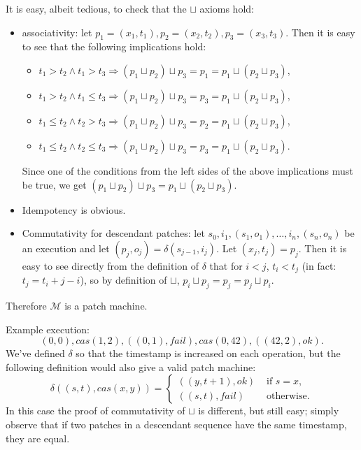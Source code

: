 \documentclass[12pt,a4paper,en]{pracamgr}
\newcommand{\mc}[1]{\mathcal{#1}}
\begin{document}
\begin{ex}
	It is easy, albeit tedious, to check that the $\sqcup$ axioms hold:
	\begin{itemize}
		\item associativity: let $p_1 = (x_1, t_1), p_2 = (x_2, t_2), p_3 = (x_3, t_3)$. Then it is easy to see that the following implications hold:
			\begin{itemize}
				\item $t_1 > t_2 \land t_1 > t_3 \Rightarrow (p_1 \sqcup p_2) \sqcup p_3 = p_1 = p_1 \sqcup (p_2 \sqcup p_3)$,
				\item $t_1 > t_2 \land t_1 \le t_3 \Rightarrow (p_1 \sqcup p_2) \sqcup p_3 = p_3 = p_1 \sqcup (p_2 \sqcup p_3)$,
				\item $t_1 \le t_2 \land t_2 > t_3 \Rightarrow (p_1 \sqcup p_2) \sqcup p_3 = p_2 = p_1 \sqcup (p_2 \sqcup p_3)$,
				\item $t_1 \le t_2 \land t_2 \le t_3 \Rightarrow (p_1 \sqcup p_2) \sqcup p_3 = p_3 = p_1 \sqcup (p_2 \sqcup p_3)$.
			\end{itemize}
            Since one of the conditions from the left sides of the above implications must be true, we get $(p_1 \sqcup p_2) \sqcup p_3 = p_1 \sqcup (p_2 \sqcup p_3)$.
		\item Idempotency is obvious.
		\item Commutativity for descendant patches: let $s_0, i_1, (s_1, o_1), \dots, i_n, (s_n, o_n)$ be an execution and let $(p_j, o_j) = \delta(s_{j-1}, i_j)$. Let $(x_j, t_j) = p_j$. Then it is easy to see directly from the definition of $\delta$ that for $i < j$, $t_i < t_j$ (in fact: $t_j = t_i + j - i$), so by definition of $\sqcup$, $p_i \sqcup p_j = p_j = p_j \sqcup p_i$.
	\end{itemize}
    Therefore $\mc M$ is a patch machine.

	Example execution:
	$$ (0, 0), cas(1, 2), ((0, 1), fail), cas(0, 42), ((42, 2), ok). $$
	We've defined $\delta$ so that the timestamp is increased on each operation, but the following definition would also give a valid patch machine:
	$$\delta((s, t), cas(x, y)) = \begin{cases} ((y, t+1), ok)&\text{ if }s = x,\\ ((s, t), fail)&\text{ otherwise.}\end{cases}$$
	In this case the proof of commutativity of $\sqcup$ is different, but still easy; simply observe that if two patches in a descendant sequence have the same timestamp, they are equal.

\end{ex}
\end{document}
